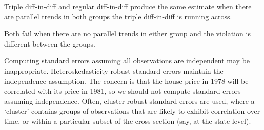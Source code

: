 \begin{remark}	Triple diff-in-diff and regular diff-in-diff produce the same estimate when there are parallel trends in both groups the triple diff-in-diff is running across.

	Both fail when there are no parallel trends in either group and the violation is different between the groups.
\end{remark}

\begin{remark}
	Computing standard errors assuming all observations are independent may be inappropriate. Heteroskedasticity robust standard errors maintain the independence assumption. The concern is that the house price in 1978 will be correlated with its price in 1981, so we should not compute standard errors assuming independence. Often, cluster-robust standard errors are used, where a `cluster' contains groups of observations that are likely to exhibit correlation over time, or within a particular subset of the cross section (say, at the state level).
\end{remark}
